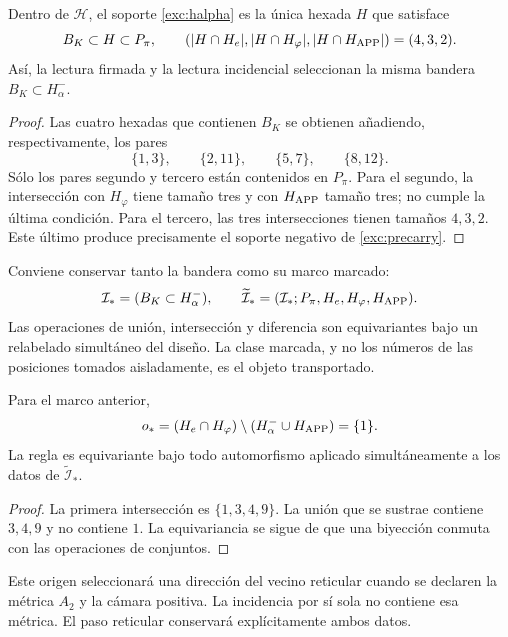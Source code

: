 

\begin{proposition}
\label{exc:selector-bandera}
Dentro de $\mathcal H$, el soporte \eqref{exc:halpha} es la única hexada
$H$ que satisface
\[
 B_K\subset H\subset P_\pi,
 \qquad
 (|H\cap H_e|,|H\cap H_\varphi|,|H\cap H_{\rm APP}|)=(4,3,2).
\]
Así, la lectura firmada y la lectura incidencial seleccionan la misma
bandera $B_K\subset H^-_\alpha$.
\end{proposition}

\begin{proof}
Las cuatro hexadas que contienen $B_K$ se obtienen añadiendo,
respectivamente, los pares
\[
 \{1,3\},\qquad\{2,11\},\qquad\{5,7\},\qquad\{8,12\}.
\]
Sólo los pares segundo y tercero están contenidos en $P_\pi$. Para el
segundo, la intersección con $H_\varphi$ tiene tamaño tres y con
$H_{\rm APP}$ tamaño tres; no cumple la última condición. Para el
tercero, las tres intersecciones tienen tamaños $4,3,2$. Este último
produce precisamente el soporte negativo de \eqref{exc:precarry}.
\end{proof}

Conviene conservar tanto la bandera como su marco marcado:
\[
 \mathcal I_*=(B_K\subset H^-_\alpha),\qquad
 \widetilde{\mathcal I}_*
   =(\mathcal I_*;P_\pi,H_e,H_\varphi,H_{\rm APP}).
\]
Las operaciones de unión, intersección y diferencia son equivariantes
bajo un relabelado simultáneo del diseño. La clase marcada, y no los
números de las posiciones tomados aisladamente, es el objeto transportado.

\begin{lemma}
\label{exc:origen}
Para el marco anterior,
\[
 o_*=(H_e\cap H_\varphi)
           \setminus(H^-_\alpha\cup H_{\rm APP})=\{1\}.
\]
La regla es equivariante bajo todo automorfismo aplicado simultáneamente
a los datos de $\widetilde{\mathcal I}_*$.
\end{lemma}

\begin{proof}
La primera intersección es $\{1,3,4,9\}$. La unión que se sustrae
contiene $3,4,9$ y no contiene $1$. La equivariancia se sigue de que una
biyección conmuta con las operaciones de conjuntos.
\end{proof}

Este origen seleccionará una dirección del vecino reticular cuando se
declaren la métrica $A_2$ y la cámara positiva. La incidencia por sí sola
no contiene esa métrica. El paso reticular conservará explícitamente
ambos datos.

